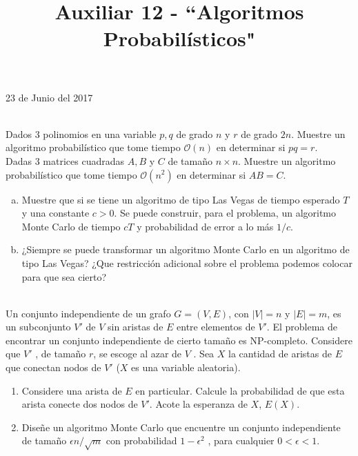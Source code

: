 \documentclass[dcc,uchile]{fcfmcourse}
\title{Auxiliar 12 - ``Algoritmos Probabilísticos"}
\begin{document}
\maketitle
\begin{center}
23 de Junio del 2017
\end{center}
\vspace{-1ex}


\begin{problems}
\\
Dados 3 polinomios en una variable $p, q$ de grado $n$ y $r$ de grado $2n$. Muestre un algoritmo probabilístico que tome tiempo $\mathcal{O}(n)$ en determinar si $pq = r$.
\\
Dadas 3 matrices cuadradas $A, B$ y $C$ de tamaño $n\times n$. Muestre un algoritmo probabilístico que tome tiempo $\mathcal{O}(n^2)$ en determinar si $AB = C$.

\begin{enumerate}[a)]
    \item Muestre que si se tiene un algoritmo de tipo Las Vegas de tiempo esperado $T$ y una constante $c>0$. Se puede construir, para el problema, un algoritmo Monte Carlo de tiempo $cT$ y probabilidad de error a lo más $1/c$.
    \item ¿Siempre se puede transformar un algoritmo Monte Carlo en un algoritmo de tipo Las Vegas? ¿Que restricción adicional sobre el problema podemos colocar para que sea cierto?
\end{enumerate}

\\
Un conjunto independiente de un grafo $G = (V, E)$, con $|V| = n$ y $|E| = m$, es un subconjunto $V'$ de $V$ sin aristas de $E$ entre elementos de $V'$. El problema de encontrar un conjunto independiente de cierto tamaño es NP-completo. Considere que $V'$ , de tamaño $r$, se escoge al azar de $V$ . Sea $X$ la cantidad de aristas de $E$
que conectan nodos de $V'$ ($X$ es una variable aleatoria).
\begin{enumerate}
\item Considere una arista de $E$ en particular. Calcule la probabilidad de que esta arista
conecte dos nodos de $V'$. Acote la esperanza de $X$, $E(X)$.
\item Diseñe un algoritmo Monte Carlo que encuentre un conjunto independiente de tamaño $\epsilon n/\sqrt{m}$ con probabilidad $1 − \epsilon^2$ , para cualquier $0 < \epsilon < 1$.    
\end{enumerate}
\end{problems}
\end{document}
